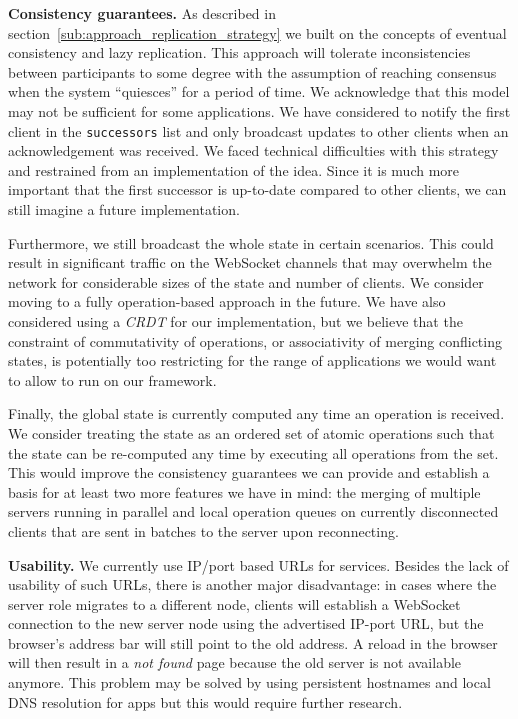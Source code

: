 \textbf{Consistency guarantees.}
As described in section~\ref{sub:approach_replication_strategy} we built \APIName on the concepts of eventual consistency and lazy replication. 
This approach will tolerate inconsistencies between participants to some degree with the assumption of reaching consensus when the system ``quiesces'' for a period of time. 
We acknowledge that this model may not be sufficient for some applications. 
We have considered to notify the first client in the \texttt{successors} list and only broadcast updates to other clients when an acknowledgement was received.
We faced technical difficulties with this strategy and restrained from an implementation of the idea.
Since it is much more important that the first successor is up-to-date compared to other clients, we can still imagine a future implementation.

Furthermore, we still broadcast the whole state in certain scenarios.
This could result in significant traffic on the WebSocket channels that may overwhelm the network for considerable sizes of the state and number of clients. 
We consider moving to a fully operation-based approach in the future.
We have also considered using a \textit{CRDT} for our implementation, but we believe that the constraint of commutativity of operations, or associativity of merging conflicting states, is potentially too restricting for the range of applications we would want to allow to run on our framework.

Finally, the global state is currently computed any time an operation is received. We consider treating the state as an ordered set of atomic operations such that the state can be re-computed any time by executing all operations from the set. This would improve the consistency guarantees we can provide and establish a basis for at least two more features we have in mind: the merging of multiple servers running in parallel and local operation queues on currently disconnected clients that are sent in batches to the server upon reconnecting.

\textbf{Usability.}
We currently use IP/port based URLs for \APIshort services. Besides the lack of usability of such URLs, there is another major disadvantage: in cases where the server role migrates to a different node, clients will establish a WebSocket connection to the new server node using the advertised IP-port URL, but the browser's address bar will still point to the old address. A reload in the browser will then result in a \textit{not found} page because the old server is not available anymore. This problem may be solved by using persistent hostnames and local DNS resolution for \APIshort apps but this would require further research.

